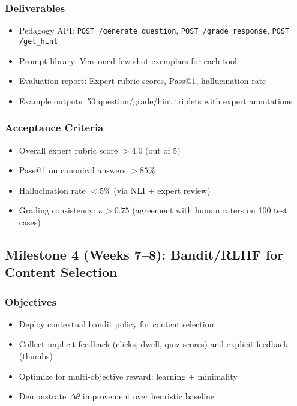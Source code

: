 \documentclass[11pt,letterpaper]{article}
\begin{document}
\subsubsection{Deliverables}
\begin{itemize}
\item Pedagogy API: \texttt{POST /generate\_question}, \texttt{POST /grade\_response}, \texttt{POST /get\_hint}
\item Prompt library: Versioned few-shot exemplars for each tool
\item Evaluation report: Expert rubric scores, Pass@1, hallucination rate
\item Example outputs: 50 question/grade/hint triplets with expert annotations
\end{itemize}

\subsubsection{Acceptance Criteria}
\begin{itemize}
\item Overall expert rubric score $> 4.0$ (out of 5)
\item Pass@1 on canonical answers $> 85\%$
\item Hallucination rate $< 5\%$ (via NLI + expert review)
\item Grading consistency: $\kappa > 0.75$ (agreement with human raters on 100 test cases)
\end{itemize}

\subsection{Milestone 4 (Weeks 7--8): Bandit/RLHF for Content Selection}\label{subsec:milestone-4}

\subsubsection{Objectives}
\begin{itemize}
\item Deploy contextual bandit policy for content selection
\item Collect implicit feedback (clicks, dwell, quiz scores) and explicit feedback (thumbs)
\item Optimize for multi-objective reward: learning + minimality
\item Demonstrate $\Delta\theta$ improvement over heuristic baseline
\end{itemize}
\end{document}
